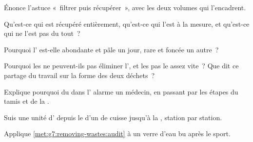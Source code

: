 \begin{exercise}[$\star$]\label{exo:g7:removing-wastes:4}
Énonce l'astuce «~filtrer puis récupérer~», avec les deux volumes
qui l'encadrent.
\end{exercise}

\begin{exercise}[$\star$]\label{exo:g7:removing-wastes:5}
Qu'est-ce qui est récupéré entièrement, qu'est-ce qui l'est à la
mesure, et qu'est-ce qui ne l'est pas du tout~?
\end{exercise}

\begin{exercise}[$\star$]\label{exo:g7:removing-wastes:6}
Pourquoi l' est-elle abondante et pâle un jour, rare et foncée
un autre~?
\end{exercise}

\begin{exercise}[$\star\star$]\label{exo:g7:removing-wastes:7}
Pourquoi les  ne peuvent-ils pas éliminer l', et les
 pas le  assez vite~? Que dit ce partage du
travail sur la forme des deux déchets~?
\end{exercise}

\begin{exercise}[$\star\star$]\label{exo:g7:removing-wastes:8}
Explique pourquoi du  dans l' alarme un médecin, en
passant par les étapes du tamis et de la .
\end{exercise}

\begin{exercise}[$\star\star$]\label{exo:g7:removing-wastes:9}
Suis une unité d' depuis le  d'un  de cuisse
jusqu'à la , station par station.
\end{exercise}

\begin{exercise}[$\star\star$]\label{exo:g7:removing-wastes:10}
Applique \cref{met:g7:removing-wastes:audit} à un verre d'eau bu
après le sport.
\end{exercise}

